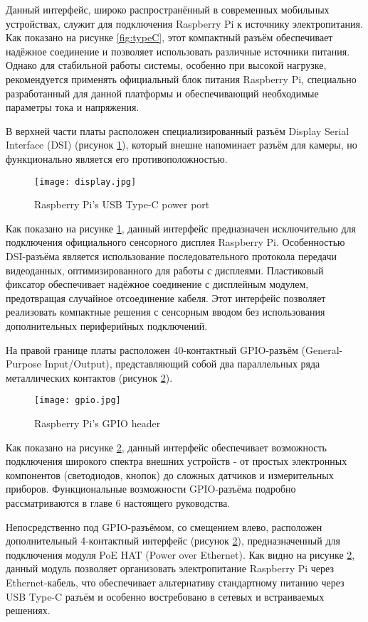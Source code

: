 Данный интерфейс, широко распространённый в современных мобильных устройствах, служит для подключения Raspberry Pi к источнику электропитания. Как показано на рисунке \ref{fig:typeC}, этот компактный разъём обеспечивает надёжное соединение и позволяет использовать различные источники питания. Однако для стабильной работы системы, особенно при высокой нагрузке, рекомендуется применять официальный блок питания Raspberry Pi, специально разработанный для данной платформы и обеспечивающий необходимые параметры тока и напряжения.


В верхней части платы расположен специализированный разъём Display Serial Interface (DSI) (рисунок \ref{fig:display}), который внешне напоминает разъём для камеры, но функционально является его противоположностью.

\begin{figure}[H]
	\centering
	\texttt{[image: display.jpg]}
	\caption{Raspberry Pi’s USB Type-C power port}
	\label{fig:display}
\end{figure}

Как показано на рисунке \ref{fig:display}, данный интерфейс предназначен исключительно для подключения официального сенсорного дисплея Raspberry Pi. Особенностью DSI-разъёма является использование последовательного протокола передачи видеоданных, оптимизированного для работы с дисплеями. Пластиковый фиксатор обеспечивает надёжное соединение с дисплейным модулем, предотвращая случайное отсоединение кабеля. Этот интерфейс позволяет реализовать компактные решения с сенсорным вводом без использования дополнительных периферийных подключений.

На правой границе платы расположен 40-контактный GPIO-разъём (General-Purpose Input/Output), представляющий собой два параллельных ряда металлических контактов (рисунок \ref{fig:gpio}).

\begin{figure}[H]
	\centering
	\texttt{[image: gpio.jpg]}
	\caption{Raspberry Pi’s GPIO header}
	\label{fig:gpio}
\end{figure}

Как показано на рисунке \ref{fig:gpio}, данный интерфейс обеспечивает возможность подключения широкого спектра внешних устройств - от простых электронных компонентов (светодиодов, кнопок) до сложных датчиков и измерительных приборов. Функциональные возможности GPIO-разъёма подробно рассматриваются в главе 6 настоящего руководства.

Непосредственно под GPIO-разъёмом, со смещением влево, расположен дополнительный 4-контактный интерфейс (рисунок \ref{fig:gpio}), предназначенный для подключения модуля PoE HAT (Power over Ethernet). Как видно на рисунке \ref{fig:gpio}, данный модуль позволяет организовать электропитание Raspberry Pi через Ethernet-кабель, что обеспечивает альтернативу стандартному питанию через USB Type-C разъём и особенно востребовано в сетевых и встраиваемых решениях.

